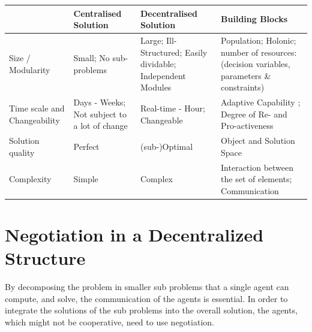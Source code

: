 \begin{tabular}{p{1.5cm} p{2.5cm} p{2.5cm} p{2.7cm}}
	\toprule
	& Centralised Solution & Decentralised Solution & Building Blocks\\
	\midrule
	Size / Modularity & Small; No sub-problems & Large; Ill-Structured; Easily dividable; Independent Modules & Population; Holonic; number of resources: (decision variables, parameters \& constraints) \citep{lang2015collaborative} \\
		\midrule
	Time scale and Changeability & Days - Weeks; Not subject to a lot of change & Real-time - Hour; Changeable  & Adaptive Capability ; Degree of Re- and Pro-activeness \citep{parunak1999industrial} \\
	\midrule
	Solution quality & Perfect & (sub-)Optimal & Object and Solution Space \citep{sharif2012yard} \\
	\midrule
	Complexity & Simple & Complex & Interaction between the set of elements; Communication \citep{pujolle2006autonomic} \\
	
	\bottomrule
\end{tabular}


\section*{Negotiation in a Decentralized Structure}
By decomposing the problem in smaller sub problems that a single agent can compute, and solve, the communication of the agents is essential. In order to integrate the solutions of the sub problems into the overall solution, the agents, which might not be cooperative, need to use negotiation.
